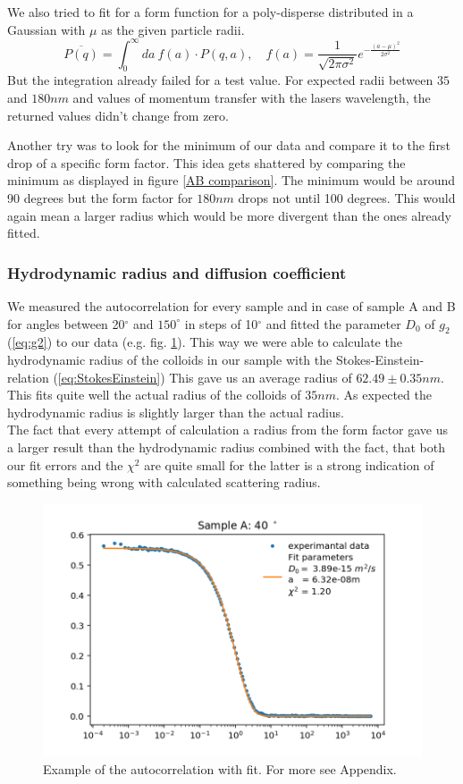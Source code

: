 \documentclass[]{article}
\begin{document}
We also tried to fit for a form function for a poly-disperse distributed in a Gaussian with $\mu$ as the given particle radii. 
\[ \overline{P(q)} = \int_0^\infty da\: f(a)\cdot P(q,a) , \quad f(a)= \frac{1}{\sqrt{2 \pi \sigma^2}} e^{-\frac{(a-\mu)^2}{2 \sigma^2}} \]
But the integration already failed for a test value. For expected radii between $35$ and $180nm$ and values of momentum transfer with the lasers wavelength, the returned values didn't change from zero.

Another try was to look for the minimum of our data and compare it to the first drop of a specific form factor. This idea gets shattered by comparing the minimum as displayed in figure \ref{AB comparison}. The minimum would be around 90 degrees but the form factor for $180nm$ drops not until 100 degrees. This would again mean a larger radius which would be more divergent than the ones already fitted.

\subsubsection{Hydrodynamic radius and diffusion coefficient}
We measured the autocorrelation for every sample and in case of sample A and B for angles between 20$^\circ$ and $150^\circ$ in steps of 10$^\circ$ and fitted the parameter $D_0$ of $g_2$ (\ref{eq:g2}) to our data (e.g. fig.  \ref{fig:Sample A 40}). This way we were able to calculate the hydrodynamic radius of the colloids in our sample with the Stokes-Einstein-relation (\ref{eq:StokesEinstein}) This gave us an average radius of $62.49 \pm  0.35nm$. This fits quite well the actual radius of the colloids of $35nm$. As expected the  hydrodynamic radius is slightly larger than the actual radius. \\ The fact that every attempt of calculation a radius from the form factor gave us a larger result than the hydrodynamic radius combined with the fact, that both our fit errors and the $\chi^2$ are quite small for the latter is a strong indication of something being wrong with calculated scattering radius.  


\begin{figure}[!htbp]
	\centering
	\includegraphics[width=0.7\linewidth]{Plots/A/40}
	\caption{Example of the autocorrelation with fit. For more see Appendix.}
	\label{fig:Sample A 40}
\end{figure}
\end{document}
